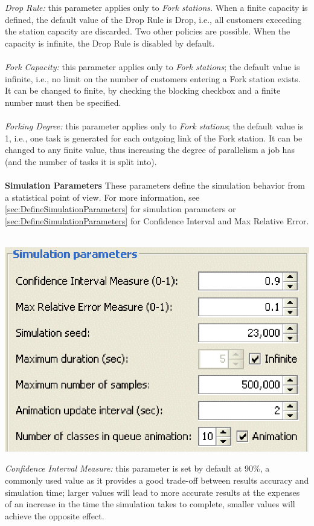 \begin{description*}
\emph{Drop Rule:}
this parameter applies only to \emph{Fork stations}. When a finite capacity is defined, the default value of the Drop Rule is Drop, i.e., all customers exceeding the station capacity are discarded. Two other policies are possible. When the capacity is infinite, the Drop Rule is disabled by default.\\\\
\emph{Fork Capacity: }
this parameter applies only to \emph{Fork stations}; the default value is infinite, i.e., no limit on the number of customers entering a Fork station exists. It can be changed to finite, by checking the blocking checkbox and a finite number must then be specified.\\\\
\emph{Forking Degree: }
this parameter applies only to \emph{Fork stations}; the default value is 1, i.e., one task is generated for each outgoing link of the Fork station. It can be changed to any finite value, thus increasing the degree of parallelism a job has (and the number of tasks it is split into).\\\\
\textbf{Simulation Parameters}
These parameters define the simulation behavior from a statistical point of view. For more information, see \autoref{sec:DefineSimulationParameters} for simulation parameters or \autoref{sec:DefineSimulationParameters} for Confidence Interval and Max Relative Error.\\\\
\begin{center}
\includegraphics[scale=.5]{img/jsim/Simulation_parameters.eps}
\end{center}
\emph{Confidence Interval Measure: }
this parameter is set by default at 90\%, a commonly used value as it provides a good trade-off between results accuracy and simulation time; larger values will lead to more accurate results at the expenses of an increase in the time the simulation takes to complete, smaller values will achieve the opposite effect.\\\\

\end{description*}
